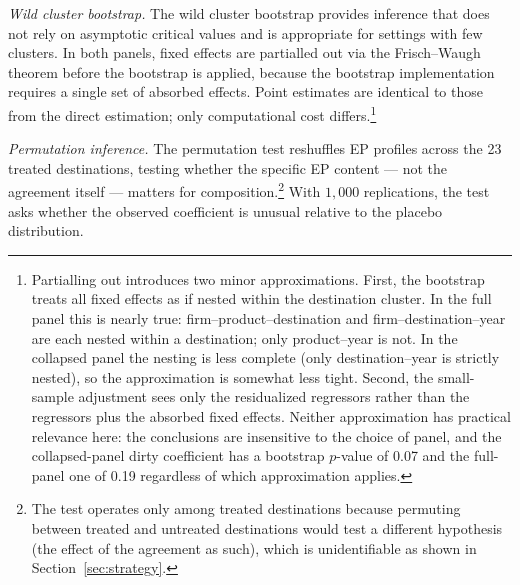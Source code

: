 \documentclass[12pt]{article}
\begin{document}
\emph{Wild cluster bootstrap.}
The wild cluster bootstrap \citep{cameron2008, roodman2019} provides inference that does not rely on asymptotic critical values and is appropriate for settings with few clusters. In both panels, fixed effects are partialled out via the Frisch--Waugh theorem before the bootstrap is applied, because the bootstrap implementation requires a single set of absorbed effects. Point estimates are identical to those from the direct estimation; only computational cost differs.\footnote{Partialling out introduces two minor approximations. First, the bootstrap treats all fixed effects as if nested within the destination cluster. In the full panel this is nearly true: firm--product--destination and firm--destination--year are each nested within a destination; only product--year is not. In the collapsed panel the nesting is less complete (only destination--year is strictly nested), so the approximation is somewhat less tight. Second, the small-sample adjustment sees only the residualized regressors rather than the regressors plus the absorbed fixed effects. Neither approximation has practical relevance here: the conclusions are insensitive to the choice of panel, and the collapsed-panel dirty coefficient has a bootstrap $p$-value of 0.07 and the full-panel one of 0.19 regardless of which approximation applies.}

\emph{Permutation inference.}
The permutation test reshuffles EP profiles across the 23 treated destinations, testing whether the specific EP content --- not the agreement itself --- matters for composition.\footnote{The test operates only among treated destinations because permuting between treated and untreated destinations would test a different hypothesis (the effect of the agreement as such), which is unidentifiable as shown in Section~\ref{sec:strategy}.} With $1{,}000$ replications, the test asks whether the observed coefficient is unusual relative to the placebo distribution.
\end{document}
